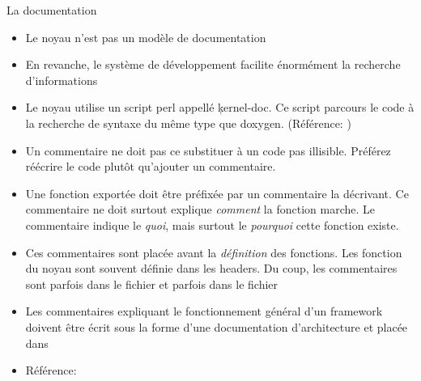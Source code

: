 \begin{frame}[fragile=singleslide]{La documentation}
  \begin{itemize}
  \item Le noyau n'est pas un modèle de documentation
  \item En  revanche, le système de  développement facilite énormément
    la recherche d'informations
  \item  Le noyau utilise  un script  perl appellé  \c{kernel-doc}. Ce
    script parcours le code à la recherche de syntaxe du même type que
    doxygen.  (Référence: )
  \item  Un  commentaire ne  doit  pas ce  substituer  à  un code  pas
    illisible.  Préférez   réécrire  le  code   plutôt  qu'ajouter  un
    commentaire.
  \item Une fonction exportée doit être préfixée par un commentaire la
    décrivant.  Ce commentaire ne doit surtout explique \emph{comment}
    la fonction  marche.  Le commentaire indique  le \emph{quoi}, mais
    surtout le \emph{pourquoi} cette fonction existe.
  \item Ces  commentaires sont  placée avant la  \emph{définition} des
    fonctions.  Les  fonction du noyau  sont souvent définie  dans les
    headers.  Du  coup, les commentaires sont parfois  dans le fichier
     et parfois dans le fichier 
  \item  Les commentaires  expliquant le  fonctionnement  général d'un
    framework  doivent être  écrit sous  la forme  d'une documentation
    d'architecture et placée dans 
  \item Référence: 
  \end{itemize}
\end{frame} 

